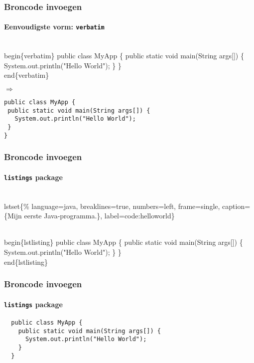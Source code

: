 \documentclass[aspectratio=169]{beamer}
\begin{document}
\begin{frame}[fragile]
 \frametitle{Broncode invoegen}
 \framesubtitle{Eenvoudigste vorm: \texttt{verbatim}}

\begin{semiverbatim}
\alert{\\begin\{verbatim\}}
public class MyApp \{
 public static void main(String args[]) \{
   System.out.println("Hello World");
 \}
\}
\alert{\\end\{verbatim\}}
\end{semiverbatim}

 \(\Rightarrow\)

\begin{verbatim}
public class MyApp {
 public static void main(String args[]) {
   System.out.println("Hello World");
 }
}
\end{verbatim}

\end{frame}

\begin{frame}[fragile]
 \frametitle{Broncode invoegen}
 \framesubtitle{\texttt{listings} package}

\begin{semiverbatim}
\\lstset\{\%
language=java,  breaklines=true,  numbers=left,
frame=single, caption=\{Mijn eerste Java-programma.\},
label=code:helloworld\}

\alert{\\begin\{lstlisting\}}
public class MyApp \{
 public static void main(String args[]) \{
   System.out.println("Hello World");
 \}
\}
\alert{\\end\{lstlisting\}}
\end{semiverbatim}

\end{frame}

\begin{frame}[fragile]
  \frametitle{Broncode invoegen}
  \framesubtitle{\texttt{listings} package}


  \begin{lstlisting}
  public class MyApp {
    public static void main(String args[]) {
      System.out.println("Hello World");
    }
  }
  \end{lstlisting}

\end{frame}
\end{document}
